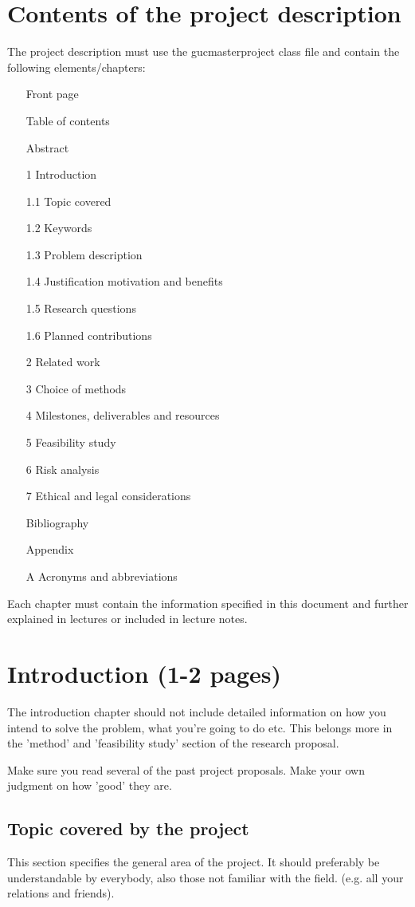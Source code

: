 \documentclass[gjovik]{gucmasterproject}
\begin{document}
\chapter{Contents of the project description}
The project description must use the gucmasterproject class file and contain the following elements/chapters:
\begin{itemize}
\item[] Front page
\item[] Table of contents
\item[] Abstract
\item[1] Introduction
\item[1.1] Topic covered
\item[1.2] Keywords
\item[1.3] Problem description
\item[1.4] Justification motivation and benefits
\item[1.5] Research questions
\item[1.6] Planned contributions
\item[2]Related work
\item[3] Choice of methods
\item[4]Milestones, deliverables and resources
\item[5]Feasibility study
\item[6]Risk analysis
\item[7]Ethical and legal considerations
\item[] Bibliography
\item[] Appendix
\item[A] Acronyms and abbreviations

\end{itemize}

Each chapter must contain the information specified in this document and further explained in 
lectures or included in lecture notes.

\chapter{Introduction (1-2 pages)}
The introduction chapter should not include detailed information on
how you intend to solve the problem, what you're going to do etc.
This belongs more in the 'method' and 'feasibility study' section
of the research proposal.

Make sure you read several of the past project proposals.
Make your own judgment on how 'good' they are.

\section{Topic covered by the project}
This section specifies the general area of the project.
It should preferably be understandable by everybody,
also those not familiar with the field. (e.g. all your relations and friends).
\end{document}
